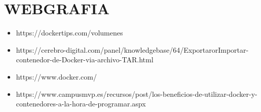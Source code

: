 \section{WEBGRAFIA} 

\begin{itemize}
\item https://dockertips.com/volumenes
\item https://cerebro-digital.com/panel/knowledgebase/64/ExportarorImportar-contenedor-de-Docker-via-archivo-TAR.html
\item  https://www.docker.com/
\item https://www.campusmvp.es/recursos/post/los-beneficios-de-utilizar-docker-y-contenedores-a-la-hora-de-programar.aspx

\end{itemize}